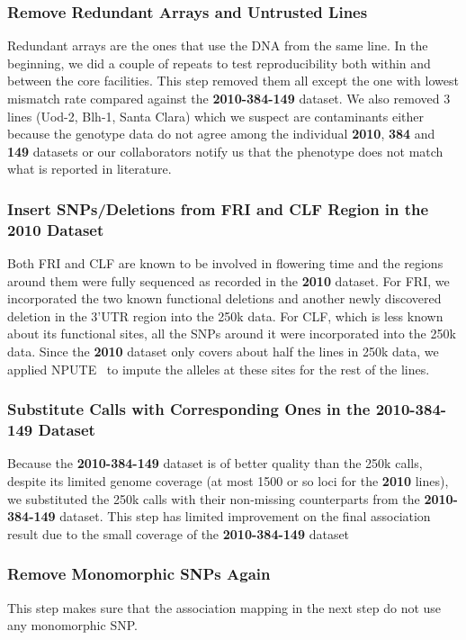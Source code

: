 \documentclass[a4paper,10pt]{article}
\begin{document}
\subsubsection{Remove Redundant Arrays and Untrusted Lines}
Redundant arrays are the ones that use the DNA from the same line. In the beginning, we did a couple of repeats to test reproducibility both within and between the core facilities. This step removed them all except the one with lowest mismatch rate compared against the \textbf{2010-384-149} dataset. We also removed 3 lines (Uod-2, Blh-1, Santa Clara) which we suspect are contaminants either because the genotype data do not agree among the individual \textbf{2010}, \textbf{384} and \textbf{149} datasets or our collaborators notify us that the phenotype does not match what is reported in literature.


\subsubsection{Insert SNPs/Deletions from FRI and CLF Region in the \textbf{2010} Dataset}
Both FRI and CLF are known to be involved in flowering time and the regions around them were fully sequenced as recorded in the \textbf{2010} dataset. For FRI, we incorporated the two known functional deletions and another newly discovered deletion in the 3'UTR region into the 250k data. For CLF, which is less known about its functional sites, all the SNPs around it were incorporated into the 250k data. Since the \textbf{2010} dataset only covers about half the lines in 250k data, we applied NPUTE~\cite{RobertsEtAl2007} to impute the alleles at these sites for the rest of the lines.

\subsubsection{Substitute Calls with Corresponding Ones in the \textbf{2010-384-149} Dataset}
Because the \textbf{2010-384-149} dataset is of better quality than the 250k calls, despite its limited genome coverage (at most 1500 or so loci for the \textbf{2010} lines), we substituted the 250k calls with their non-missing counterparts from the \textbf{2010-384-149} dataset. This step has limited improvement on the final association result due to the small coverage of the \textbf{2010-384-149} dataset

\subsubsection{Remove Monomorphic SNPs Again}
This step makes sure that the association mapping in the next step do not use any monomorphic SNP.
\end{document}
